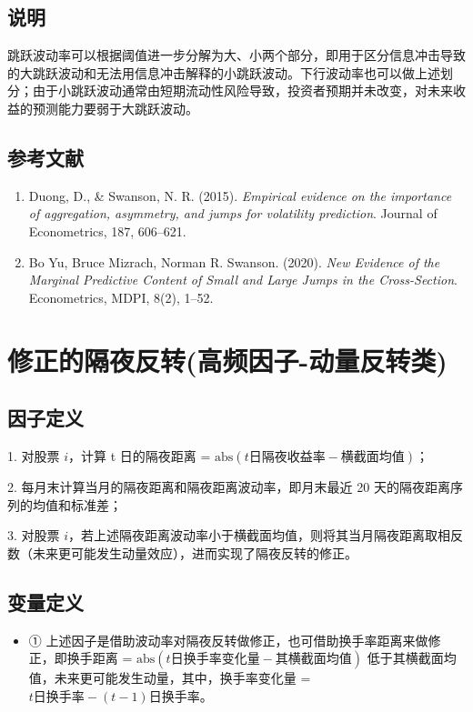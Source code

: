 \documentclass{article}
\begin{document}
\subsection{说明}
跳跃波动率可以根据阈值进一步分解为大、小两个部分，即用于区分信息冲击导致的大跳跃波动和无法用信息冲击解释的小跳跃波动。下行波动率也可以做上述划分；由于小跳跃波动通常由短期流动性风险导致，投资者预期并未改变，对未来收益的预测能力要弱于大跳跃波动。

\subsection{参考文献}
\begin{enumerate}
    \item Duong, D., \& Swanson, N. R. (2015). \textit{Empirical evidence on the importance of aggregation, asymmetry, and jumps for volatility prediction}. Journal of Econometrics, 187, 606–621.
    \item Bo Yu, Bruce Mizrach, Norman R. Swanson. (2020). \textit{New Evidence of the Marginal Predictive Content of Small and Large Jumps in the Cross-Section}. Econometrics, MDPI, 8(2), 1–52.
\end{enumerate}

\section{修正的隔夜反转(高频因子-动量反转类)}

\subsection{因子定义}

1. 对股票 \( i \)，计算 t 日的隔夜距离 = \(\mathrm{abs}(t\text{日隔夜收益率} - \text{横截面均值})\)；

2. 每月末计算当月的隔夜距离和隔夜距离波动率，即月末最近 20 天的隔夜距离序列的均值和标准差；

3. 对股票 \( i \)，若上述隔夜距离波动率小于横截面均值，则将其当月隔夜距离取相反数（未来更可能发生动量效应），进而实现了隔夜反转的修正。

\subsection{变量定义}
\begin{itemize}
    \item ① 上述因子是借助波动率对隔夜反转做修正，也可借助换手率距离来做修正，即换手距离 = \(\mathrm{abs}(t\text{日换手率变化量} - \text{其横截面均值})\) 低于其横截面均值，未来更可能发生动量，其中，换手率变化量 = \(t\text{日换手率} - (t-1)\text{日换手率}\)。
\end{itemize}
\end{document}
